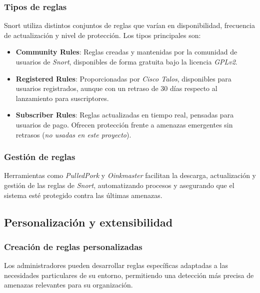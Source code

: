 \documentclass[11pt,a4paper,twoside]{report}
\begin{document}
\subsubsection{Tipos de reglas}

Snort utiliza distintos conjuntos de reglas que varían en disponibilidad, frecuencia de actualización y nivel de protección. Los tipos principales son:

\begin{itemize}
	\item \textbf{Community Rules}: Reglas creadas y mantenidas por la comunidad de usuarios de \textit{Snort}, disponibles de forma gratuita bajo la licencia \textit{GPLv2}.
	
	\item \textbf{Registered Rules}: Proporcionadas por \textit{Cisco Talos}, disponibles para usuarios registrados, aunque con un retraso de 30 días respecto al lanzamiento para suscriptores.
	
	\item \textbf{Subscriber Rules}: Reglas actualizadas en tiempo real, pensadas para usuarios de pago. Ofrecen protección frente a amenazas emergentes sin retrasos \cite{snort_talos} (\textit{no usadas en este proyecto}).
\end{itemize}


\subsubsection{Gestión de reglas}

Herramientas como \textit{PulledPork} y \textit{Oinkmaster} facilitan la descarga, actualización y gestión de las reglas de \textit{Snort}, automatizando procesos y asegurando que el sistema esté protegido contra las últimas amenazas.

\subsection{Personalización y extensibilidad}

\subsubsection{Creación de reglas personalizadas}

Los administradores pueden desarrollar reglas específicas adaptadas a las necesidades particulares de su entorno, permitiendo una detección más precisa de amenazas relevantes para su organización.
\end{document}
